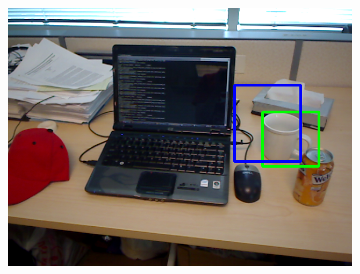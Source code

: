 \begin{figure}
\begin{subfigure}[b]{0.3\textwidth}
		\includegraphics[width=\textwidth]{img/seguimiento_solo_frame/solo_frame-desk_1-coffee_mug_5-frame_28.png}
	\end{subfigure}



\end{figure}
